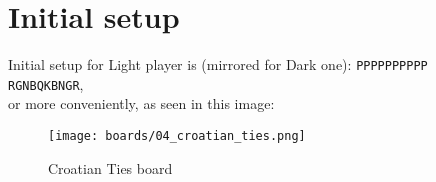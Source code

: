 \section*{Initial setup}

Initial setup for Light player is (mirrored for Dark one):
\texttt{PPPPPPPPPP \\
        RGNBQKBNGR}, \\
or more conveniently, as seen in this image:

\noindent
\begin{figure}[h]
\texttt{[image: boards/04\_croatian\_ties.png]}
\caption{Croatian Ties board}
\label{fig:croatian_ties}
\end{figure}

\clearpage %
